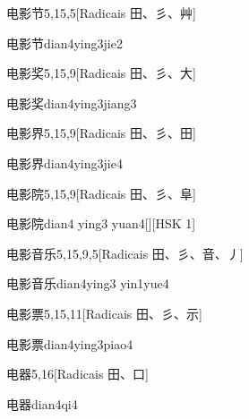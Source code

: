 \begin{entry}{电影节}{5,15,5}[Radicais ⽥、⼺、⾋]
  \begin{phonetics}{电影节}{dian4ying3jie2}
  \end{phonetics}
\end{entry}

\begin{entry}{电影奖}{5,15,9}[Radicais ⽥、⼺、⼤]
  \begin{phonetics}{电影奖}{dian4ying3jiang3}
  \end{phonetics}
\end{entry}

\begin{entry}{电影界}{5,15,9}[Radicais ⽥、⼺、⽥]
  \begin{phonetics}{电影界}{dian4ying3jie4}
  \end{phonetics}
\end{entry}

\begin{entry}{电影院}{5,15,9}[Radicais ⽥、⼺、⾩]
  \begin{phonetics}{电影院}{dian4 ying3 yuan4}[][HSK 1]
  \end{phonetics}
\end{entry}

\begin{entry}{电影音乐}{5,15,9,5}[Radicais ⽥、⼺、⾳、⼃]
  \begin{phonetics}{电影音乐}{dian4ying3 yin1yue4}
  \end{phonetics}
\end{entry}

\begin{entry}{电影票}{5,15,11}[Radicais ⽥、⼺、⽰]
  \begin{phonetics}{电影票}{dian4ying3piao4}
  \end{phonetics}
\end{entry}

\begin{entry}{电器}{5,16}[Radicais ⽥、⼝]
  \begin{phonetics}{电器}{dian4qi4}
  \end{phonetics}
\end{entry}

